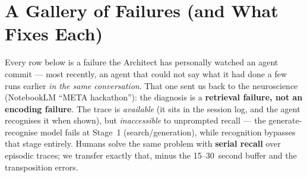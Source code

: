 \section{A Gallery of Failures (and What Fixes Each)}
Every row below is a failure the Architect has personally watched an agent commit --- most
recently, an agent that could not say what it had done a few runs earlier \emph{in the same
conversation}. That one sent us back to the neuroscience (NotebookLM ``META hackathon''): the
diagnosis is a \textbf{retrieval failure, not an encoding failure}. The trace is \emph{available}
(it sits in the session log, and the agent recognises it when shown), but \emph{inaccessible} to
unprompted recall --- the generate-recognise model fails at Stage~1 (search/generation), while
recognition bypasses that stage entirely. Humans solve the same problem with \textbf{serial
recall} over episodic traces; we transfer exactly that, minus the 15--30~second buffer and the
transposition errors.
